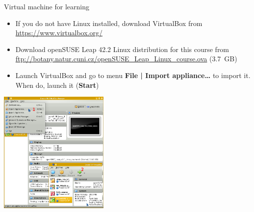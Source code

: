 \documentclass[compress, ucs, xelatex, 11pt, xcolor=svgnames,
  hyperref={
    bookmarks=true,
    unicode=true,
    colorlinks=true,
    pdftitle={Linux, command line and MetaCentrum},
    plainpages=false,
    pdfauthor={Vojtech Zeisek},
    pdfsubject={Course about use of Linux command line, writing shell scripts and using MetaCentrum of CESNET},
    pdfcreator={XeLaTeX},
    pdfkeywords={Linux, GNU, BASH, shell, command line, MetaCentrum},
    linkcolor=Red,
    anchorcolor=Blue,
    citecolor=Purple,
    filecolor=DodgerBlue,
    menucolor=DarkOrchid,
    urlcolor=DeepSkyBlue,
    pdftex},
  url={hyphens, lowtilde} %
  ]{beamer}
\begin{document}
\begin{frame}{Virtual machine for learning}
  \begin{multicols}{2}
    \begin{itemize}
      \item If you do not have Linux installed, download VirtualBox from \url{https://www.virtualbox.org/}
      \item Download openSUSE Leap 42.2 Linux distribution for this course from \url{ftp://botany.natur.cuni.cz/openSUSE_Leap_Linux_course.ova} (3.7~GB)
      \item Launch VirtualBox and go to menu \textbf{File | Import appliance\ldots} to import it. When do, launch it (\textbf{Start})
    \end{itemize}
    \includegraphics[height=6cm]{virtualbox.png}
  \end{multicols}
\end{frame}
\end{document}
